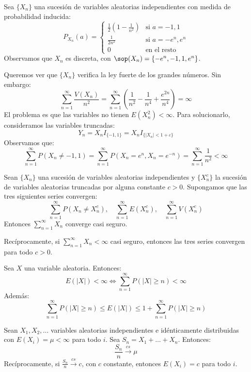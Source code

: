 \begin{example}
    Sea $\{X_n\}$ una sucesión de variables aleatorias independientes con medida de probabilidad inducida:
    $$P_{X_n}(a) = \begin{cases}
            \frac{1}{2}\left(1-\frac{1}{n^2}\right) & \text{si } a = -1, 1     \\
            \frac{1}{2n^2}                          & \text{si } a = -e^n, e^n \\
            0                                       & \text{en el resto}
        \end{cases}$$
    Observamos que $X_n$ es discreta, con $\sop(X_n) = \{-e^n, -1, 1, e^n\}$.

    Queremos ver que $\{X_n\}$ verifica la ley fuerte de los grandes números.
    Sin embargo:
    $$\sum_{n=1}^\infty \frac{V(X_n)}{n^2} = \sum_{n=1}^\infty \left(\frac{1}{n^2} - \frac{1}{n^4} + \frac{e^{2n}}{n^4}\right) = \infty$$
    El problema es que las variables no tienen $E(X_n^2) < \infty$.
    Para solucionarlo, consideramos las variables truncadas:
    $$Y_n = X_nI_{\{-1, 1\}} = X_n I_{\{|X_n| < 1 + \varepsilon\}}$$
    Observamos que:
    $$\sum_{n=1}^\infty P(X_n \neq -1, 1) = \sum_{n=1}^\infty P(X_n = e^n, X_n = e^{-n}) = \sum_{n=1}^\infty \frac{1}{n^2} < \infty$$
\end{example}

\begin{theorem}
    Sean $\{X_n\}$ una sucesión de variables aleatorias independientes y $\{X_n^c\}$ la sucesión de variables aleatorias truncadas por alguna constante $c > 0$.
    Supongamos que las tres siguientes series convergen:
    $$\sum_{n=1}^\infty P(X_n \neq X_n^c), \quad \sum_{n=1}^\infty E(X_n^c), \quad \sum_{n=1}^\infty V(X_n^c)$$
    Entonces $\sum_{n=1}^\infty X_n$ converge casi seguro.

    Recíprocamente, si $\sum_{n=1}^\infty X_n < \infty$ casi seguro, entonces las tres series convergen para todo $c > 0$.
\end{theorem}

\begin{lemma}
    Sea $X$ una variable aleatoria.
    Entonces:
    $$E(|X|) < \infty \Leftrightarrow \sum_{n=1}^\infty P(|X| \geq n) < \infty$$
    Además:
    $$\sum_{n=1}^\infty P(|X| \geq n) \leq E(|X|) \leq 1 + \sum_{n=1}^\infty P(|X| \geq n)$$
\end{lemma}

\begin{theorem}
    Sean $X_1, X_2, \dots$ variables aleatorias independientes e idénticamente distribuidas con $E(X_i) = \mu < \infty$ para todo $i$.
    Sea $S_n = X_1 + \dots + X_n$.
    Entonces:
    $$\frac{S_n}{n} \xrightarrow{cs} \mu$$
    Recíprocamente, si $\frac{S_n}{n} \xrightarrow{cs} c$, con $c$ constante, entonces $E(X_i) = c$ para todo $i$.
\end{theorem}

